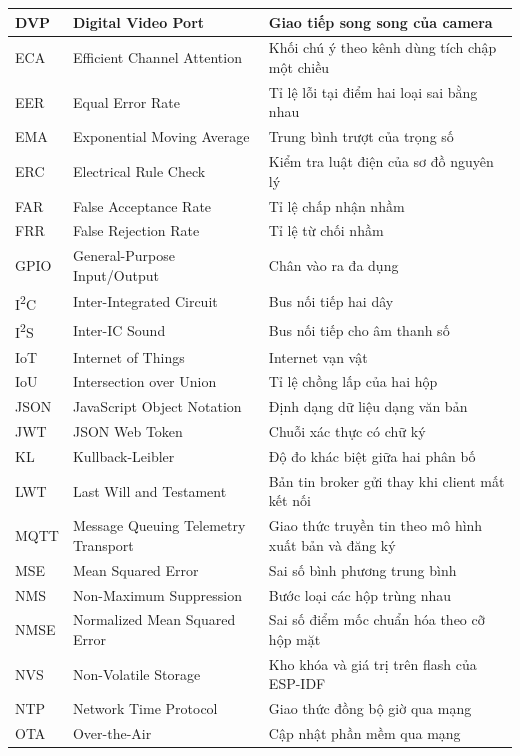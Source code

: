 \documentclass[../DoAn.tex]{subfiles}
\begin{document}
\begin{longtable}{|l|L{5.2cm}|L{6cm}|}
\hline
DVP & Digital Video Port & Giao tiếp song song của camera \\
\hline
ECA & Efficient Channel Attention & Khối chú ý theo kênh dùng tích chập một chiều \\
\hline
EER & Equal Error Rate & Tỉ lệ lỗi tại điểm hai loại sai bằng nhau \\
\hline
EMA & Exponential Moving Average & Trung bình trượt của trọng số \\
\hline
ERC & Electrical Rule Check & Kiểm tra luật điện của sơ đồ nguyên lý \\
\hline
FAR & False Acceptance Rate & Tỉ lệ chấp nhận nhầm \\
\hline
FRR & False Rejection Rate & Tỉ lệ từ chối nhầm \\
\hline
GPIO & General-Purpose Input/Output & Chân vào ra đa dụng \\
\hline
I\textsuperscript{2}C & Inter-Integrated Circuit & Bus nối tiếp hai dây \\
\hline
I\textsuperscript{2}S & Inter-IC Sound & Bus nối tiếp cho âm thanh số \\
\hline
IoT & Internet of Things & Internet vạn vật \\
\hline
IoU & Intersection over Union & Tỉ lệ chồng lấp của hai hộp \\
\hline
JSON & JavaScript Object Notation & Định dạng dữ liệu dạng văn bản \\
\hline
JWT & JSON Web Token & Chuỗi xác thực có chữ ký \\
\hline
KL & Kullback-Leibler & Độ đo khác biệt giữa hai phân bố \\
\hline
LWT & Last Will and Testament & Bản tin broker gửi thay khi client mất kết nối \\
\hline
MQTT & Message Queuing Telemetry Transport & Giao thức truyền tin theo mô hình xuất bản và đăng ký \\
\hline
MSE & Mean Squared Error & Sai số bình phương trung bình \\
\hline
NMS & Non-Maximum Suppression & Bước loại các hộp trùng nhau \\
\hline
NMSE & Normalized Mean Squared Error & Sai số điểm mốc chuẩn hóa theo cỡ hộp mặt \\
\hline
NVS & Non-Volatile Storage & Kho khóa và giá trị trên flash của ESP-IDF \\
\hline
NTP & Network Time Protocol & Giao thức đồng bộ giờ qua mạng \\
\hline
OTA & Over-the-Air & Cập nhật phần mềm qua mạng \\

\end{longtable}
\end{document}
